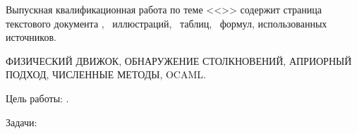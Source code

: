 
Выпускная квалификационная работа по теме <<\Topic>> содержит
\pageref{LastPage} страница текстового документа \TODO,
\totalfigures~иллюстраций,
\totaltables~таблиц,
\totalequations~формул,
 использованных источников.

\MakeUppercase{
    физический движок,
    обнаружение столкновений,
    априорный подход,
    численные методы,
    OCaml.
}

Цель работы: \Target.

Задачи:

\Tasks
